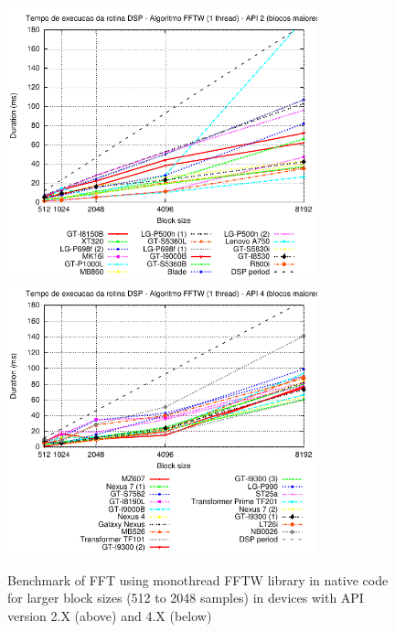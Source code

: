 \documentclass[12pt]{article}
\begin{document}
\begin{figure}[h!]
\begin{center}
\includegraphics[width=0.8\textwidth]{img/FFTW_MONO-2-b.pdf}
\includegraphics[width=0.8\textwidth]{img/FFTW_MONO-4-b.pdf}
\end{center}
\caption{Benchmark of FFT using monothread FFTW library in native code for larger block
sizes (512 to 2048 samples) in devices with API version 2.X (above) and 4.X
(below)}
\label{fig:alg-fft2}
\end{figure}
\end{document}
